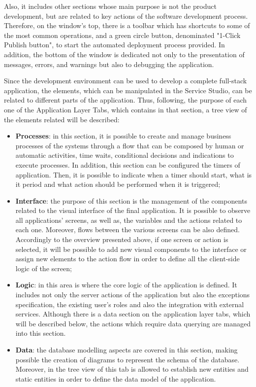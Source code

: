 Also, it includes other sections whose main purpose is not the product development, but are related to key actions of the software development process. Therefore, on the window’s top, there is a toolbar which has shortcuts to some of the most common operations, and a green circle button, denominated "1-Click Publish button", to start the automated deployment process provided. In addition, the bottom of the window is dedicated not only to the presentation of messages, errors, and warnings but also to debugging the application.

Since the development environment can be used to develop a complete full-stack application, the elements, which can be manipulated in the Service Studio, can be related to different parts of the application. Thus, following, the purpose of each one of the Application Layer Tabs, which contains in that section, a tree view of the elements related will be described:

\begin{itemize}
	\item \textbf{Processes}: in this section, it is possible to create and manage business processes of the systems through a flow that can be composed by human or automatic activities, time waits, conditional decisions and indications to execute processes. In addition, this section can be configured the timers of application. Then, it is possible to indicate when a timer should start, what is it period and what action should be performed when it is triggered;
	\item \textbf{Interface}: the purpose of this section is the management of the components related to the visual interface of the final application. It is possible to observe all applications’ screens, as well as, the variables and the actions related to each one. Moreover, flows between the various screens can be also defined. Accordingly to the overview presented above, if one screen or action is selected, it will be possible to add new visual components to the interface or assign new elements to the action flow in order to define all the client-side logic of the screen;
	\item \textbf{Logic}: in this area is where the core logic of the application is defined. It includes not only the server actions of the application but also the exceptions specification, the existing user’s roles and also the integration with external services. Although there is a data section on the application layer tabs, which will be described below, the actions which require data querying are managed into this section.
	\item \textbf{Data}: the database modelling aspects are covered in this section, making possible the creation of diagrams to represent the schema of the database. Moreover, in the tree view of this tab is allowed to establish new entities and static entities in order to define the data model of the application.
\end{itemize}

